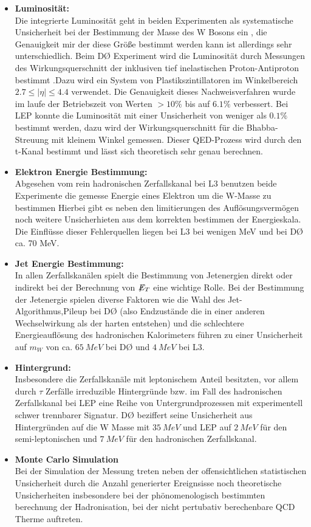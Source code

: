 \documentclass[a4paper,12pt]{article}
\newcommand{\met}{\ensuremath{\not\mathrel{E}}_T}
\begin{document}
\begin{itemize}
	\item \textbf{Luminosität:} \\
	Die integrierte Luminosität geht in beiden Experimenten als systematische Unsicherheit bei der Bestimmung der Masse des W Bosons ein
	, die Genauigkeit mir der diese Größe bestimmt werden kann ist allerdings sehr unterschiedlich. Beim DØ Experiment wird die Luminosität
	durch Messungen des Wirkungsquerschnitt der inklusiven tief inelastischen Proton-Antiproton bestimmt \cite{2011arXiv1106.5182P}.Dazu
	wird ein System von Plastikszintillatoren im Winkelbereich $2.7 \leq |\eta| \leq 4.4$ verwendet. Die Genauigkeit dieses Nachweisverfahren wurde
	im laufe der Betriebszeit von Werten $ > 10\%$ bis auf $ 6.1\%$ verbessert. Bei LEP konnte die Luminosität mit einer Unsicherheit von weniger
	als $0.1\%$ bestimmt werden, dazu wird der Wirkungsquerschnitt für die Bhabba-Streuung mit kleinem Winkel gemessen. Dieser QED-Prozess
	wird durch den t-Kanal bestimmt und lässt sich theoretisch sehr genau berechnen.
	\item \textbf{Elektron Energie Bestimmung:} \\
	Abgesehen vom rein hadronischen Zerfallskanal bei L3 benutzen beide Experimente die gemesse Energie eines Elektron um die W-Masse zu bestimmen
	Hierbei gibt es neben den limitierungen des Auflösungsvermögen noch weitere Unsicherhieten aus dem korrekten bestimmen der Energieskala.
	Die Einflüsse dieser Fehlerquellen liegen bei L3 bei wenigen MeV und bei DØ ca. 70 MeV.
	\item \textbf{Jet Energie Bestimmung:} \\
	In allen Zerfallskanälen spielt die Bestimmung von Jetenergien direkt oder indirekt bei der Berechnung von $\met$ eine wichtige Rolle. Bei der 
	Bestimmung der Jetenergie spielen diverse Faktoren wie die Wahl des Jet-Algorithmus,Pileup bei DØ (also Endzustände die in einer anderen Wechselwirkung
	als der harten entstehen) und die schlechtere Energieauflösung des hadronischen Kalorimeters führen zu einer Unsicherheit auf $m_{W}$ von 
	ca. $\SI{65}{MeV}$ bei DØ und $\SI{4}{MeV}$ bei L3.
	\item \textbf{Hintergrund:}\\
	Insbesondere die Zerfallskanäle mit leptonischem Anteil besitzten, vor allem durch $\tau$ Zerfälle irreduzible Hintergründe bzw. im Fall
	des hadronischen Zerfallskanal bei LEP eine Reihe von Untergrundprozessen mit experimentell schwer trennbarer Signatur. DØ beziffert seine 
	Unsicherheit aus Hintergründen auf die W Masse mit $\SI{35}{MeV}$ und LEP auf $\SI{2}{MeV}$ für den semi-leptonischen und $\SI{7}{MeV}$ 
	für den hadronischen Zerfallskanal.
	\item \textbf{Monte Carlo Simulation}\\
	Bei der Simulation der Messung treten neben der offensichtlichen statistischen Unsicherheit durch die Anzahl generierter Ereignsisse noch
	theoretische Unsicherheiten insbesondere bei der phönomenologisch bestimmten berechnung der Hadronisation, bei der nicht pertubativ berechenbare
	QCD Therme auftreten. 
\end{itemize}
\end{document}
